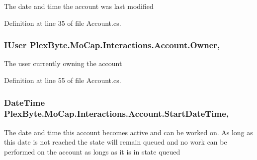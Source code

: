 The date and time the account was last modified 



Definition at line 35 of file Account.\+cs.

\subsubsection[{\texorpdfstring{Owner}{Owner}}]{\setlength{\rightskip}{0pt plus 5cm}I\+User Plex\+Byte.\+Mo\+Cap.\+Interactions.\+Account.\+Owner\hspace{0.3cm}{\ttfamily [get]}, {\ttfamily [set]}}\hypertarget{class_plex_byte_1_1_mo_cap_1_1_interactions_1_1_account_a36d8ba4726f5289eabc6173ad9e910d6}{}\label{class_plex_byte_1_1_mo_cap_1_1_interactions_1_1_account_a36d8ba4726f5289eabc6173ad9e910d6}


The user currently owning the account 



Definition at line 55 of file Account.\+cs.

\subsubsection[{\texorpdfstring{Start\+Date\+Time}{StartDateTime}}]{\setlength{\rightskip}{0pt plus 5cm}Date\+Time Plex\+Byte.\+Mo\+Cap.\+Interactions.\+Account.\+Start\+Date\+Time\hspace{0.3cm}{\ttfamily [get]}, {\ttfamily [set]}}\hypertarget{class_plex_byte_1_1_mo_cap_1_1_interactions_1_1_account_a5e26981bffb5bdee06beb50888553ec0}{}\label{class_plex_byte_1_1_mo_cap_1_1_interactions_1_1_account_a5e26981bffb5bdee06beb50888553ec0}


The date and time this account becomes active and can be worked on. As long as this date is not reached the state will remain queued and no work can be performed on the account as longs as it is in state queued 



